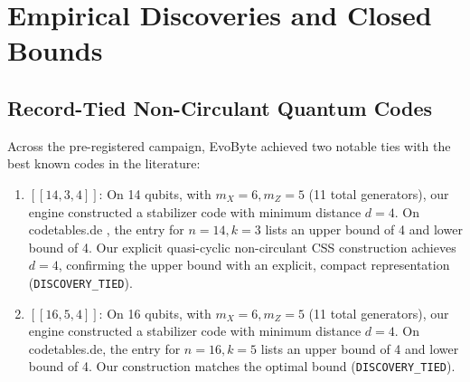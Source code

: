 \documentclass[11pt,a4paper]{article}
\begin{document}
\section{Empirical Discoveries and Closed Bounds}
\label{sec:results}

\subsection{Record-Tied Non-Circulant Quantum Codes}
\label{sec:qecc_results}
Across the pre-registered campaign, EvoByte achieved two notable ties with the best known codes in the literature:
\begin{enumerate}
    \item $[[14, 3, 4]]$: On 14 qubits, with $m_X = 6, m_Z = 5$ (11 total generators), our engine constructed a stabilizer code with minimum distance $d=4$. On codetables.de \cite{grassl2026codetables}, the entry for $n=14, k=3$ lists an upper bound of 4 and lower bound of 4. Our explicit quasi-cyclic non-circulant CSS construction achieves $d=4$, confirming the upper bound with an explicit, compact representation (\texttt{DISCOVERY\_TIED}).
    \item $[[16, 5, 4]]$: On 16 qubits, with $m_X = 6, m_Z = 5$ (11 total generators), our engine constructed a stabilizer code with minimum distance $d=4$. On codetables.de, the entry for $n=16, k=5$ lists an upper bound of 4 and lower bound of 4. Our construction matches the optimal bound (\texttt{DISCOVERY\_TIED}).
\end{enumerate}

\begin{table}[h]
\centering
\small
\caption{Quantum Error-Correcting Stabilizer Codes in Program D045.}
\label{tab:qecc}
\end{table}
\end{document}
